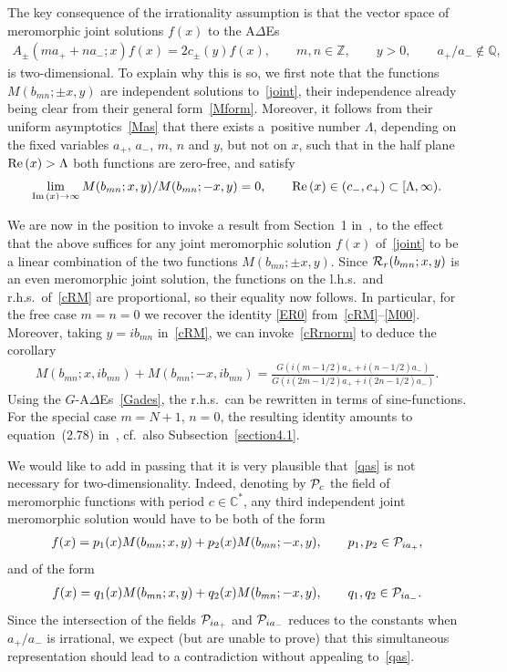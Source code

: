 \documentclass[11pt]{article}
\numberwithin{equation}{section}
\newcommand{\De}{\Delta}
\newcommand{\Z}{{\mathbb Z}}
\newcommand{\C}{{\mathbb C}}
\newcommand{\Q}{{\mathbb Q}}
\newcommand{\re}{{\rm Re}\, }
\newcommand{\im}{{\rm Im}\, }
\newcommand{\cR}{{\cal R}}
\newcommand{\cP}{{\cal P}}
\begin{document}
The key consequence of the irrationality assumption is that the vector space of meromorphic joint solutions $f(x)$ to the A$\De$Es
\begin{gather}\label{joint}
A_{\pm}( ma_{+}+na_{-};x)f(x)=2c_{\pm}(y)f(x),\qquad  m,n\in\Z,\qquad y>0,\qquad  a_{+}/a_{-}\notin \Q,
\end{gather}
is two-dimensional.
To explain why this is so, we f\/irst note that the functions $M(b_{mn};\pm x,y)$ are independent solutions to~\eqref{joint}, their independence already being clear from their general form~\eqref{Mform}. Moreover, it follows from their uniform asymptotics~\eqref{Mas} that there exists a~po\-si\-ti\-ve number $\Lambda$, depending on the f\/ixed variables $a_+$, $a_-$, $m$, $n$ and $y$, but not on $x$, such that in the half plane $\re(x)>\Lambda$ both functions are zero-free, and satisfy
\begin{gather}\label{qas}
\lim_{\im(x)\to\infty}M(b_{mn};x,y)/M(b_{mn};-x,y)=0,\qquad \re(x)\in (c_{-},c_{+})\subset [\Lambda, \infty).
\end{gather}

We are now in the position to invoke a result from Section~1 in~\cite{side}, to the ef\/fect that the above  suf\/f\/ices for any joint meromorphic solution $f(x)$ of~\eqref{joint} to be a linear combination of the two functions $M(b_{mn};\pm x,y)$.  Since $\cR_r(b_{mn};x,y)$ is an even meromorphic joint solution, the functions on the l.h.s.\ and r.h.s.\ of~\eqref{cRM} are proportional, so their equality now follows. In particular, for the free case $m=n=0$ we recover the identity \eqref{ER0} from~\eqref{cRM}--\eqref{M00}. Moreover, taking $y=ib_{mn}$ in~\eqref{cRM}, we can invoke~\eqref{cRrnorm} to deduce the corollary
\begin{gather}\label{Mid}
M(b_{mn};x,ib_{mn})+M(b_{mn};-x,ib_{mn})=\frac{G(i(m-1/2)a_{+}+i(n-1/2)a_{-})}{G(i(2m-1/2)a_{+}+i(2n-1/2)a_{-})}.
\end{gather}
Using the $G$-A$\De$Es~\eqref{Gades}, the r.h.s.\ can be rewritten in terms of sine-functions. For the special case $m=N+1$, $n=0$, the resulting identity amounts to equation~(2.78) in~\cite{GLFII}, cf.~also Subsection~\ref{section4.1}.

We would like to add in passing that it is very plausible that~\eqref{qas} is not necessary for two-dimensionality. Indeed, denoting by $\cP_c$ the f\/ield of meromorphic functions with period $c\in\C^{*}$, any third independent joint meromorphic solution would have to be both of the form
\begin{gather}\label{form1}
f(x)=p_1(x)M(b_{mn};x,y)+p_2(x)M(b_{mn};-x,y),\qquad p_1,p_2\in\cP_{ia_{+}},
\end{gather}
and of the form
\begin{gather}\label{form2}
f(x)=q_1(x)M(b_{mn};x,y)+q_2(x)M(b_{mn};-x,y),\qquad  q_1,q_2\in\cP_{ia_{-}}.
\end{gather}
Since the intersection of the f\/ields $\cP_{ia_{+}}$ and $\cP_{ia_{-}}$ reduces
 to the constants when $a_{+}/a_{-}$ is irrational, we expect (but are unable to prove) that this simultaneous representation should lead to a contradiction without appealing to~\eqref{qas}.
\end{document}
